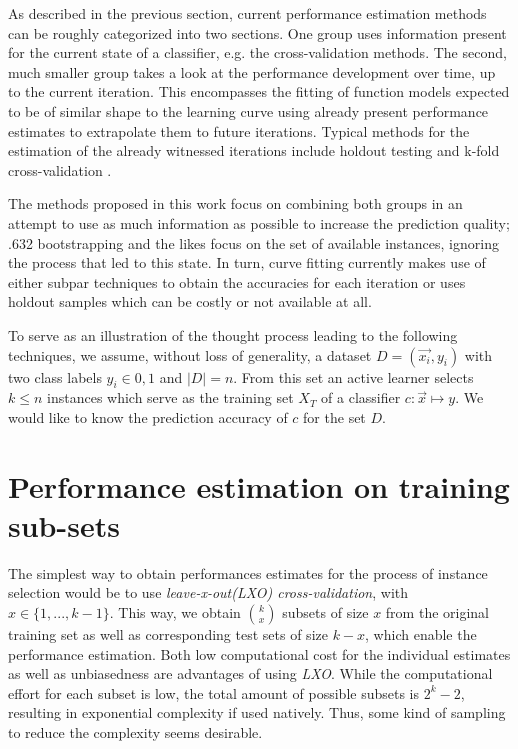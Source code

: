 \label{methods}
As described in the previous section, current performance estimation methods can be roughly categorized into two sections. One group uses information present for the current state of a classifier, e.g. the cross-validation methods. The second, much smaller group takes a look at the performance development over time, up to the current iteration. This encompasses the fitting of function models expected to be of similar shape to the learning curve using already present performance estimates to extrapolate them to future iterations. Typical methods for the estimation of the already witnessed iterations include holdout testing and k-fold cross-validation \cite{FigueroaEtal2012}.

The methods proposed in this work focus on combining both groups in an attempt to use as much information as possible to increase the prediction quality; .632 bootstrapping and the likes focus on the set of available instances, ignoring the process that led to this state. In turn, curve fitting currently makes use of either subpar techniques to obtain the accuracies for each iteration or uses holdout samples which can be costly or not available at all.

To serve as an illustration of the thought process leading to the following techniques, we assume, without loss of generality, a dataset $D = {(\vec{x_i}, y_i)}$ with two class labels $y_i \in {0, 1}$ and $|D| = n$. From this set an active learner selects $k \leq n$ instances which serve as the training set $X_T$ of a classifier $c: \vec{x} \mapsto y$. We would like to know the prediction accuracy of $c$ for the set $D$.

\section{Performance estimation on training sub-sets}
The simplest way to obtain performances estimates for the process of instance selection would be to use \textit{leave-x-out(LXO) cross-validation}, with $x \in \{1,...,k-1\}$. This way, we obtain $k \choose x$ subsets of size $x$ from the original training set as well as corresponding test sets of size $k-x$, which enable the performance estimation. Both low computational cost for the individual estimates as well as unbiasedness \cite{RodriguezEtAl2013} are advantages of using \textit{LXO}. While the computational effort for each subset is low, the total amount of possible subsets is $2^k - 2$, resulting in exponential complexity if used natively. Thus, some kind of sampling to reduce the complexity seems desirable.

